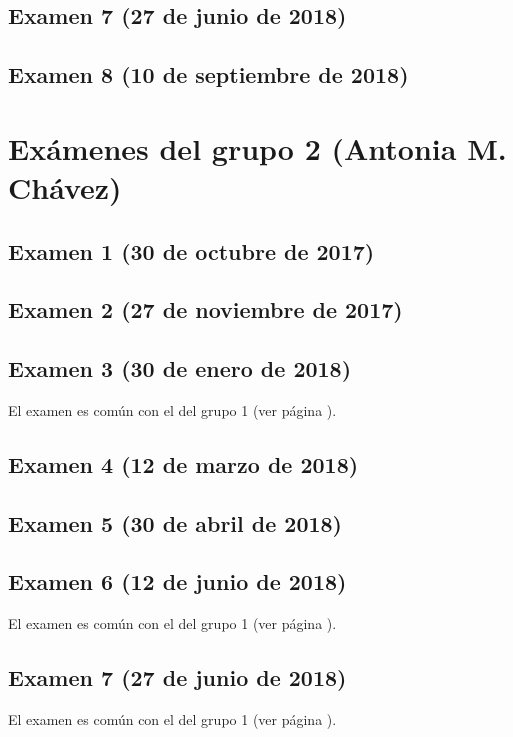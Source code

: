 \documentclass[a4paper,12pt,twoside]{book}
\begin{document}
\subsection{Examen 7 (27 de junio de 2018)}
 \label{examen_17_18_4_7}
\subsection{Examen 8 (10 de septiembre de 2018)}
 \label{examen_17_18_4_8}

\section{Exámenes del grupo 2 (Antonia M. Chávez)}
\subsection{Examen 1 (30 de octubre de 2017)}
\subsection{Examen 2 (27 de noviembre de 2017)}
\subsection{Examen 3 (30 de enero de 2018)}
El examen es común con el del grupo 1 (ver página \pageref{examen_17_18_1_3}).
\subsection{Examen 4 (12 de marzo de 2018)}
\subsection{Examen 5 (30 de abril de 2018)}
\subsection{Examen 6 (12 de junio de 2018)}
El examen es común con el del grupo 1 (ver página \pageref{examen_17_18_1_6}).
\subsection{Examen 7 (27 de junio de 2018)}
El examen es común con el del grupo 1 (ver página \pageref{examen_17_18_4_7}).
\end{document}
